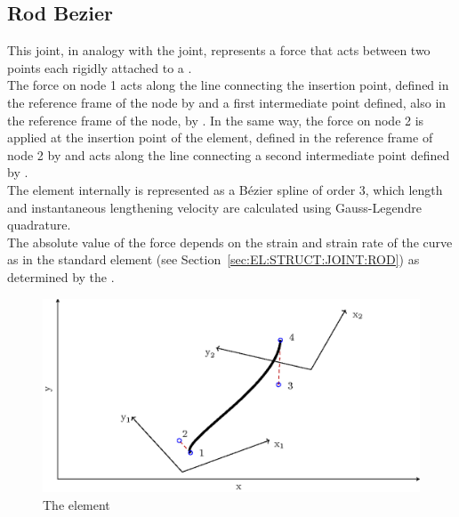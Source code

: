 \subsection{Rod Bezier}
\label{sec:EL:STRUCT:JOINT:ROD_BEZIER}
This joint, in analogy with the  joint, represents a force 
that acts between two points each rigidly attached to a 
.\\ The force on 
node 1 acts along the line connecting the insertion point, 
defined in the reference frame of the node by 
 and a first intermediate point defined,
also in the reference frame of the node, by .
In the same way, the force on node 2 is applied at the insertion 
point of the element, defined in the reference frame of node 2 by
 and acts along the line connecting a
second intermediate point defined by . \\
The element internally is represented as a B\'ezier spline of order 3,
which length and instantaneous lengthening velocity are calculated
using Gauss-Legendre quadrature.\\ The absolute value of the force
depends on the strain and strain rate of the curve as in the
standard  element (see Section~\ref{sec:EL:STRUCT:JOINT:ROD})
as determined by the 
.

\begin{figure}
\centering
\includegraphics[width=.7\textwidth]{rod_bezier}
\caption{The  element}
\label{fig:EL:STRUCT:JOINT:ROD_BEZIER}
\end{figure}

